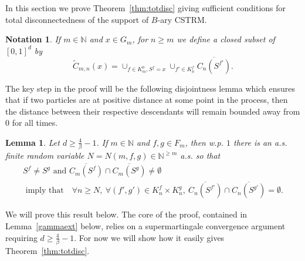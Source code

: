 \documentclass[12pt]{article}
\numberwithin{theorem}{section}
\newtheorem{lemma}[theorem]{Lemma}
\theoremstyle{def}
\newtheorem*{notation}{Notation}
\numberwithin{equation}{section}
\newcommand{\N}{\mathbb{N}}
\begin{document}
In this section we prove Theorem~\ref{thm:totdisc} giving sufficient conditions for total disconnectedness of the support of $B$-ary CSTRM.
\begin{notation} If $m\in\N$ and $x\in G_m$, for $n\ge m$ we define a closed subset of $[0,1]^d$ by
\[
\widetilde C_{m,n}(x)=\cup_{f\in K^0_m,S^f=x}\cup_{f'\in K^f_n} \overline{C_n(S^{f'})}.
\]
\end{notation}

The key step in the proof will be the following disjointness lemma
which ensures that if two particles are at positive distance at some point in the process, then the distance between their respective descendants will remain bounded away from $0$ for all times.

\begin{lemma}\label{disjcells} Let $d\ge \frac{4}{\beta}-1$.  If $m\in\N$ and $f,g\in F_m$, then w.p. $1$ there is an a.s. finite random variable  $N=N(m,f,g)\in\N^{\ge m}$ a.s. so that 
\begin{multline*}S^f\neq S^g\text{ and }\overline{C_m(S^f)}\cap\overline{C_m(S^g)}\neq\emptyset\\
\text{ imply that} \quad  \forall n\ge N, \  \forall (f',g')\in K_n^f\times K_n^g, \ \overline{C_n(S^{f'})}\cap\overline{C_n(S^{g'})}=\emptyset.
\end{multline*}
\end{lemma}
We will prove this result below.  
The core of the proof, contained in Lemma~\ref{gammaext} below, relies on a supermartingale convergence argument requiring $d\ge \frac{4}{\beta}-1$. For now we will show how it easily gives Theorem~\ref{thm:totdisc}. 
\end{document}
